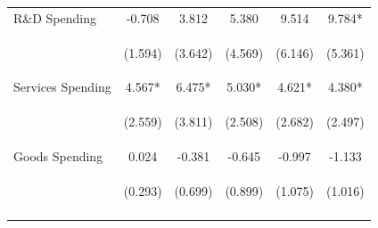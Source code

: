 \documentclass[dv_diss_main.tex]{subfiles}
\begin{document}
\begin{table}[H]
\begin{center}
{\begin{tabular}{lccccc}
    R\&D Spending & -0.708 & 3.812 & 5.380 & 9.514 & 9.784* \\
    \vspace{4pt} & \begin{footnotesize}(1.594)\end{footnotesize} & \begin{footnotesize}(3.642)\end{footnotesize} & \begin{footnotesize}(4.569)\end{footnotesize} & \begin{footnotesize}(6.146)\end{footnotesize} & \begin{footnotesize}(5.361)\end{footnotesize} \\
    Services Spending & 4.567* & 6.475* & 5.030* & 4.621* & 4.380* \\
    \vspace{4pt} & \begin{footnotesize}(2.559)\end{footnotesize} & \begin{footnotesize}(3.811)\end{footnotesize} & \begin{footnotesize}(2.508)\end{footnotesize} & \begin{footnotesize}(2.682)\end{footnotesize} & \begin{footnotesize}(2.497)\end{footnotesize} \\
    Goods Spending & 0.024 & -0.381 & -0.645 & -0.997 & -1.133 \\
     & \begin{footnotesize}(0.293)\end{footnotesize} & \begin{footnotesize}(0.699)\end{footnotesize} & \begin{footnotesize}(0.899)\end{footnotesize} & \begin{footnotesize}(1.075)\end{footnotesize} & \begin{footnotesize}(1.016)\end{footnotesize} \\

     \hline
    \vspace{-2pt} & \vspace{-2pt} & \vspace{-2pt} & \vspace{-2pt} & \vspace{-2pt} \\
    

\end{tabular}}
\end{center}
\end{table}
\end{document}
